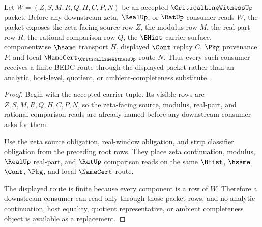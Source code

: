 \begin{theorem}
\label{thm:critical-line-witness-root-zeta-real-rat-source-readiness}
Let $W=(Z,S,M,R,Q,H,C,P,N)$ be an accepted $\CriticalLineWitnessUp$ packet. Before any downstream zeta, $\RealUp$, or $\RatUp$ consumer reads $W$, the packet exposes the zeta-facing source row $Z$, the modulus row $M$, the real-part row $R$, the rational-comparison row $Q$, the $\BHist$ carrier surface, componentwise $\hsame$ transport $H$, displayed $\Cont$ replay $C$, $\Pkg$ provenance $P$, and local $\NameCert_{\CriticalLineWitnessUp}$ route $N$. Thus every such consumer receives a finite BEDC route through the displayed packet rather than an analytic, host-level, quotient, or ambient-completeness substitute.
\end{theorem}
\begin{proof}
Begin with the accepted carrier tuple. Its visible rows are $Z,S,M,R,Q,H,C,P,N$, so the zeta-facing source, modulus, real-part, and rational-comparison reads are already named before any downstream consumer asks for them.

Use the zeta source obligation, real-window obligation, and strip classifier obligation from the preceding root rows. They place zeta continuation, modulus, $\RealUp$ real-part, and $\RatUp$ comparison reads on the same $\BHist$, $\hsame$, $\Cont$, $\Pkg$, and local $\NameCert$ route.

The displayed route is finite because every component is a row of $W$. Therefore a downstream consumer can read only through those packet rows, and no analytic continuation, host equality, quotient representative, or ambient completeness object is available as a replacement.
\end{proof}

